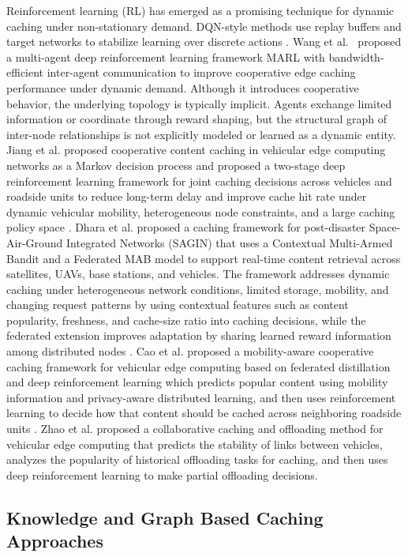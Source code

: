 Reinforcement learning (RL) has emerged as a promising technique for dynamic caching under non-stationary demand. DQN-style methods use replay buffers and target networks to stabilize learning over discrete actions \cite{mnih2015dqn,vanhasselt2016double}. Wang et al.~\cite{Min2020MARL} proposed a multi-agent deep reinforcement learning framework MARL with bandwidth-efficient inter-agent communication to improve cooperative edge caching performance under dynamic demand. Although it introduces cooperative behavior, the underlying topology is typically implicit. Agents exchange limited information or coordinate through reward shaping, but the structural graph of inter-node relationships is not explicitly modeled or learned as a dynamic entity. Jiang et al. proposed cooperative content caching in vehicular edge computing networks as a Markov decision process and proposed a two-stage deep reinforcement learning framework for joint caching decisions across vehicles and roadside units to reduce long-term delay and improve cache hit rate under dynamic vehicular mobility, heterogeneous node constraints, and a large caching policy space \cite{jiang2026cooperative}. Dhara et al. proposed a caching framework for post-disaster Space-Air-Ground Integrated Networks (SAGIN) that uses a Contextual Multi-Armed Bandit and a Federated MAB model to support real-time content retrieval across satellites, UAVs, base stations, and vehicles. The framework addresses dynamic caching under heterogeneous network conditions, limited storage, mobility, and changing request patterns by using contextual features such as content popularity, freshness, and cache-size ratio into caching decisions, while the federated extension improves adaptation by sharing learned reward information among distributed nodes \cite{dhara2026co}. Cao et al. proposed a mobility-aware cooperative caching framework for vehicular edge computing based on federated distillation and deep reinforcement learning which predicts popular content using mobility information and privacy-aware distributed learning, and then uses reinforcement learning to decide how that content should be cached across neighboring roadside units \cite{cao2025}. Zhao et al. \cite{zhao2026collaborative} proposed a collaborative caching and offloading method for vehicular edge computing that predicts the stability of links between vehicles, analyzes the popularity of historical offloading tasks for caching, and then uses deep reinforcement learning to make partial offloading decisions.

\subsection{Knowledge and Graph Based Caching Approaches}


